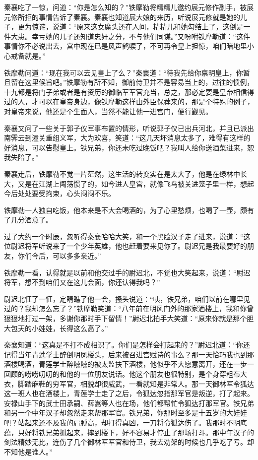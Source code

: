 \documentclass[12pt,oneside]{book}
\begin{document}
秦襄吃了一惊，问道：``你是怎么知的？''铁摩勒将精精儿邀约展元修作副手，被展元修所拒的事情告诉了秦襄。秦襄也知道展大娘的来历，听说展元修就是她的儿子，更为惊诧，说道：``原来这女魔头还在人间，精精儿和她勾结上了，这倒是一件大患。幸亏她的儿子还知道忠奸之分，不与他们同谋。''又吩咐铁摩勒道：``这件事情你不必说出去，宫中现在已是风声鹤唳了，不可再令皇上担惊，咱们暗地里小心戒备就是。''

铁摩勒问道：``现在我可以去见皇上了么？''秦襄道：``待我先给你禀明皇上，你暂且留在这里候旨吧。''铁摩勒有所不知，御前侍卫并不是容易当上的，过往的惯例，十九都是将门子弟或者是有资历的御临军军官充当，总之，那必定要是皇帝相信得过的人，才可以在皇帝身边，像铁摩勒这样由外臣保荐来的，那是个特殊的例子，对皇帝来说，他还是个生面人，当然不能让他一进宫门，便行觐见。

秦襄又问了一些关于郭子仪军事布置的情形，听说郭子仪已出兵河北，并且已派出南霁云到潼关重组义军，大为欢喜，笑道：``这几天坏消息太多了，难得有这样的好消息，可以告慰皇上。铁兄弟，你还未吃过晚饭吧？我叫人给你送酒菜进来，恕我失陪了。''

秦襄走后，铁摩勒不觉一片茫然，这生活的转变实在是太大了，他是在绿林中长大，又是在江湖上闯荡惯了的，如今进人皇宫，就像飞鸟被关进笼子里一样，想起今后处处要受拘束，心头闷闷不乐。

铁摩勒一人独自吃饭，他本来是不大会喝酒的，为了心里愁烦，也喝了一壶，颇有了几分酒意了。

过了大约一个时辰，忽听得秦襄哈哈大笑，和一个黑脸汉子走了进来，说道：``这位尉迟将军听说来了一个少年英雄，他也赶着要来见你了。尉迟兄是我最要好的朋友，你们今后，可以多多亲近。''

铁摩勒一看，认得就是以前和他交过手的尉迟北，不觉也大笑起来，说道：``尉迟将军，想不到咱们又在这儿会面，你还认得我吗？''

尉迟北怔了一怔，定睛瞧了他一会，搔头说道：``咦，铁兄弟，咱们以前在哪里见过的？我却怎么忘了？''铁摩勒笑道：``八年前在明风门外的那家酒楼上，我和你曾狠狠地打过一架，多谢你那时手下留情！''尉迟北拍手大笑道：``原来你就是那个胆大包天的小娃娃，长得这么高了。''

秦襄知道：``这真是不打不成相识了。你们是怎样会打起来的？''尉迟北道：``你还记得当年青莲学士醉倒明凤楼头，后来被召进宫赋诗的事么？那一天恰巧我也到那酒楼喝酒，青莲学士醉醺醺的被太监扶下酒楼，他似乎不大愿意离开，还在一步一回顾的唠唠叨叨的和他的一位朋友说话。他这个朋友也很特别，是个身穿粗布大衣，脚踏麻鞋的穷军官，相貌却很威武，一看就知是非常人。那一天御林军令狐达这一班人也在酒楼上，青莲学士走了之后，令狐达忽指那军官是叛逆，打了起来。安禄山手下的武士田承嗣、薛嵩等人也在场，他们都帮忙令狐达打那军官。铁兄弟和另一个中年汉子却忽然走来帮那军官。铁兄弟，你那时至多是十五岁的大娃娃吧？站起来还不及我的肩膊高，却打得真凶，一刀将令狐达伤了。我那时不明底蕴，只好将铁兄弟抓起来，摔到楼下，好不容易才停止了那场打斗。那中年汉子的剑法精妙无比，连伤了几个御林军军官和侍卫，我去劝架的时候也几乎吃了亏。却不知他是谁人。''
\end{document}
